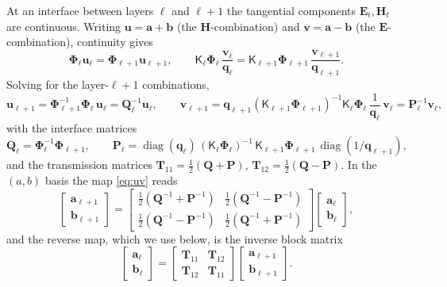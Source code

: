 \documentclass[11pt]{article}
\theoremstyle{remark}
\newcommand{\kp}{\mathsf{K}}
\newcommand{\Ph}{\mathbf{\Phi}}
\newcommand{\fq}{\mathbf{q}}
\newcommand{\fa}{\mathbf{a}}
\newcommand{\fb}{\mathbf{b}}
\DeclareMathOperator{\diag}{diag}
\begin{document}
At an interface between layers $\ell$ and $\ell+1$ the tangential components
$\mathbf{E}_t,\mathbf{H}_t$ are continuous.  Writing
$\mathbf{u}=\fa+\fb$ (the $\mathbf{H}$-combination) and
$\mathbf{v}=\fa-\fb$ (the $\mathbf{E}$-combination), continuity gives
\begin{equation}
\Ph_\ell\mathbf{u}_\ell=\Ph_{\ell+1}\mathbf{u}_{\ell+1},\qquad
\kp_\ell\Ph_\ell\,\frac{\mathbf{v}_\ell}{\fq_\ell}
=\kp_{\ell+1}\Ph_{\ell+1}\,\frac{\mathbf{v}_{\ell+1}}{\fq_{\ell+1}}.
\label{eq:continuity}
\end{equation}
Solving for the layer-$\ell+1$ combinations,
\begin{equation}
\mathbf{u}_{\ell+1}=\Ph_{\ell+1}^{-1}\Ph_\ell\,\mathbf{u}_\ell
=\mathbf{Q}_\ell^{-1}\mathbf{u}_\ell,\qquad
\mathbf{v}_{\ell+1}=\fq_{\ell+1}(\kp_{\ell+1}\Ph_{\ell+1})^{-1}
\kp_\ell\Ph_\ell\,\frac{1}{\fq_\ell}\,\mathbf{v}_\ell
=\mathbf{P}_\ell^{-1}\mathbf{v}_\ell,
\label{eq:uv}
\end{equation}
with the interface matrices
\begin{equation}
\mathbf{Q}_\ell=\Ph_\ell^{-1}\Ph_{\ell+1},\qquad  
\mathbf{P}_\ell=\diag(\fq_\ell)\,(\kp_\ell\Ph_\ell)^{-1}\,\kp_{\ell+1}\Ph_{\ell+1}\,
\diag(1/\fq_{\ell+1}),
\label{eq:QP}
\end{equation}
and the transmission matrices $\mathbf{T}_{11}=\tfrac12(\mathbf{Q}+\mathbf{P})$,
$\mathbf{T}_{12}=\tfrac12(\mathbf{Q}-\mathbf{P})$.  In the $(a,b)$ basis the
map \eqref{eq:uv} reads
\begin{equation}
\begin{bmatrix}\fa_{\ell+1}\\ \fb_{\ell+1}\end{bmatrix}
=\begin{bmatrix}
\tfrac12(\mathbf{Q}^{-1}+\mathbf{P}^{-1}) & \tfrac12(\mathbf{Q}^{-1}-\mathbf{P}^{-1})\\
\tfrac12(\mathbf{Q}^{-1}-\mathbf{P}^{-1}) & \tfrac12(\mathbf{Q}^{-1}+\mathbf{P}^{-1})
\end{bmatrix}
\begin{bmatrix}\fa_\ell\\ \fb_\ell\end{bmatrix},
\label{eq:Tfwd}
\end{equation}
and the reverse map, which we use below, is the inverse block matrix
\begin{equation}
\begin{bmatrix}\fa_\ell\\ \fb_\ell\end{bmatrix}
=\begin{bmatrix}\mathbf{T}_{11}&\mathbf{T}_{12}\\
\mathbf{T}_{12}&\mathbf{T}_{11}\end{bmatrix}
\begin{bmatrix}\fa_{\ell+1}\\ \fb_{\ell+1}\end{bmatrix}.
\label{eq:Trev}
\end{equation}
\end{document}
